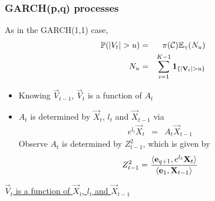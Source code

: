 \documentclass{beamer}
\begin{document}
\begin{frame}
  \frametitle{GARCH(p,q) processes}
  As in the GARCH(1,1) case,
  \begin{eqnarray*}
    \mathbb{P}(|V_t| > u) &=& \pi(\mathcal C) \mathbb{E}_\gamma(N_u) \\
    N_u &=& \sum_{i=1}^{K-1} \mathbf{1}_{\{|\mathbf{V}_t| > u\}}
  \end{eqnarray*}
  \begin{itemize}
  \item Knowing $\vec V_{t-1}$, $\vec V_t$ is a function of $A_t$
  \item $A_t$ is determined by $\vec X_t$, $l_t$ and $\vec X_{t-1}$ via
    \begin{eqnarray*}
      e^{l_t} \vec X_t &=& A_t \vec X_{t-1}
    \end{eqnarray*}
    Observe $A_t$ is determined by $Z_{t-1}^2$, which is given by
    \[
    Z_{t-1}^2 = {
      \langle\mathbf{e}_{q+1}, e^{l_t} \mathbf{X}_{t}\rangle
      \over
      \langle\mathbf{e}_{1}, \mathbf{X}_{t-1}\rangle
    }
    \]
  \end{itemize}
  \underline{$\vec V_t$ is a function of $\vec X_t$, $l_t$ and $\vec X_{t-1}$}
\end{frame}
\end{document}
